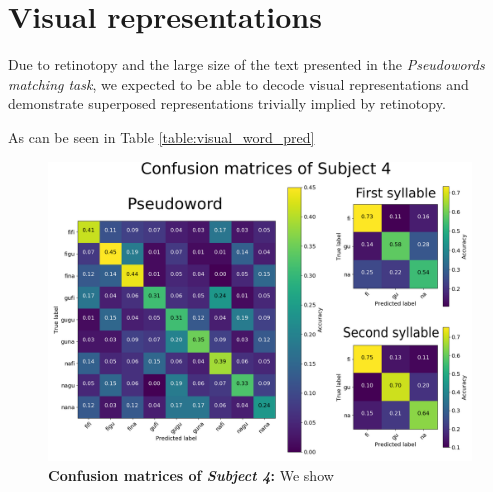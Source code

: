 \section{Visual representations}

Due to retinotopy and the large size of the text presented in the \emph{Pseudowords matching task}, we expected to be able to decode visual representations and demonstrate superposed representations trivially implied by retinotopy.

As can be seen in Table \ref{table:visual_word_pred}


\begin{figure}[ht]
\scriptsize
\vspace{2ex}
\includegraphics[width=1.\linewidth]{figures/part_II/confusion_subject_4.png}
\vspace{3ex}
\caption{\textbf{Confusion matrices of \emph{Subject 4}:}
We show }
\label{fig:visual_confusion}
\end{figure}


